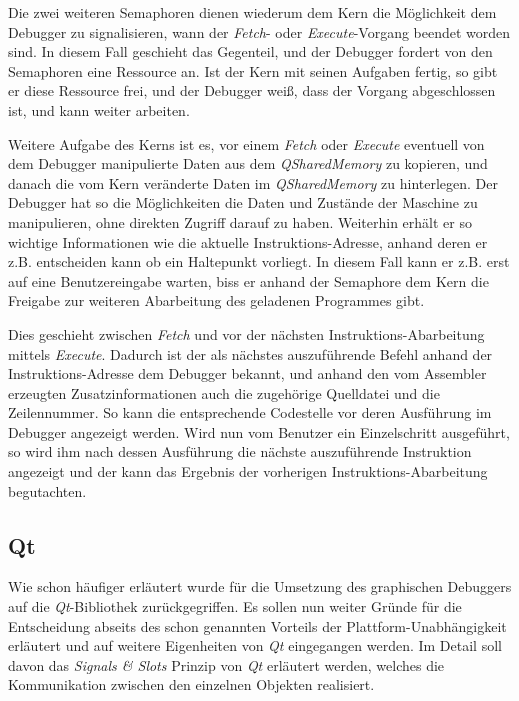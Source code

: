 Die zwei weiteren Semaphoren dienen wiederum dem Kern die Möglichkeit dem Debugger zu signalisieren, wann der \emph{Fetch}- oder \emph{Execute}-Vorgang beendet worden sind. In diesem Fall geschieht das Gegenteil, und der Debugger fordert von den Semaphoren eine Ressource an. Ist der Kern mit seinen Aufgaben fertig, so gibt er diese Ressource frei, und der Debugger weiß, dass der Vorgang abgeschlossen ist, und kann weiter arbeiten.

Weitere Aufgabe des Kerns ist es, vor einem \emph{Fetch} oder \emph{Execute} eventuell von dem Debugger manipulierte Daten aus dem \emph{QSharedMemory} zu kopieren, und danach die vom Kern veränderte Daten im \emph{QSharedMemory} zu hinterlegen. Der Debugger hat so die Möglichkeiten die Daten und Zustände der Maschine zu manipulieren, ohne direkten Zugriff darauf zu haben. Weiterhin erhält er so wichtige Informationen wie die aktuelle Instruktions-Adresse, anhand deren er z.B. entscheiden kann ob ein Haltepunkt vorliegt. In diesem Fall kann er z.B. erst auf eine Benutzereingabe warten, biss er anhand der Semaphore dem Kern die Freigabe zur weiteren Abarbeitung des geladenen Programmes gibt.

Dies geschieht zwischen \emph{Fetch} und vor der nächsten Instruktions-Abarbeitung mittels \emph{Execute}. Dadurch ist der als nächstes auszuführende Befehl anhand der Instruktions-Adresse dem Debugger bekannt, und anhand den vom Assembler erzeugten Zusatzinformationen auch die zugehörige Quelldatei und die Zeilennummer. So kann die entsprechende Codestelle vor deren Ausführung im Debugger angezeigt werden. Wird nun vom Benutzer ein Einzelschritt ausgeführt, so wird ihm nach dessen Ausführung die nächste auszuführende Instruktion angezeigt und der kann das Ergebnis der vorherigen Instruktions-Abarbeitung begutachten.  

\subsection{Qt}

Wie schon häufiger erläutert wurde für die Umsetzung des graphischen Debuggers auf die \emph{Qt}-Bibliothek zurückgegriffen. Es sollen nun weiter Gründe für die Entscheidung abseits des schon genannten Vorteils der Plattform-Unabhängigkeit erläutert und auf weitere Eigenheiten von \emph{Qt} eingegangen werden. Im Detail soll davon das \emph{Signals \& Slots} Prinzip von \emph{Qt} erläutert werden, welches die Kommunikation zwischen den einzelnen Objekten realisiert.

